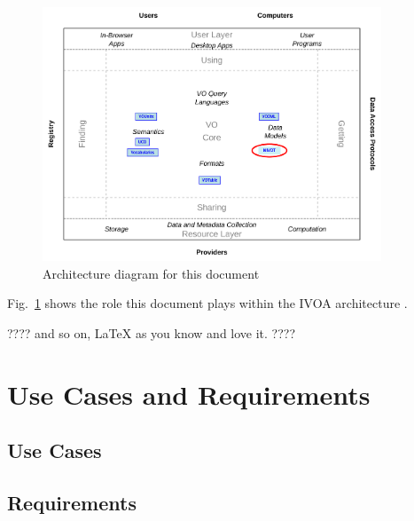\documentclass[11pt,a4paper]{ivoa}
\begin{document}
\begin{figure}
\centering


\includegraphics[width=0.9\textwidth]{role_diagram.pdf}
\caption{Architecture diagram for this document}
\label{fig:archdiag}
\end{figure}

Fig.~\ref{fig:archdiag} shows the role this document plays within the
IVOA architecture \citep{note:VOARCH}.

???? and so on, LaTeX as you know and love it. ????

\section{Use Cases and Requirements}

\subsection{Use Cases}

\subsection{Requirements}
\end{document}
